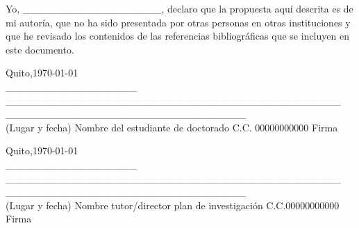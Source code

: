 Yo, \_\_\_\_\_\_\_\_\_\_\_\_\_\_\_\_\_\_\_, declaro que la propuesta aquí descrita es de mi autoría, que no ha sido presentada por otras personas en otras instituciones y que he revisado los contenidos de las referencias bibliográficas que se incluyen en este documento.

\vspace{1cm}

\begin{flushleft}
	Quito,\today\\
	\_\_\_\_\_\_\_\_\_\_\_\_\_\_\_\_\_\_\hspace{0.1cm} \_\_\_\_\_\_\_\_\_\_\_\_\_\_\_\_\_\_\_\_\_\_\_\_\_\_\_\_\_\_\_\_\_\_\_\_\_\_\_\_\_\_\_\_\_\_  \hspace{0.3cm}\_\_\_\_\_\_\_\_\_\_\_\_\_\_\_\_\_\hspace{0.1cm}\_\_\_\_\_\_\_\_\_\_\_\_\_\_\_\_\\
	(Lugar y fecha) \hspace{0.2cm} Nombre del estudiante de doctorado \hspace{0.2cm} C.C.\hspace{0.05cm} 00000000000 \hspace{0.1cm} Firma \\
\end{flushleft}

\vspace{1cm}

\begin{flushleft}
	Quito,\today\\
	\_\_\_\_\_\_\_\_\_\_\_\_\_\_\_\_\_\_\hspace{0.1cm} \_\_\_\_\_\_\_\_\_\_\_\_\_\_\_\_\_\_\_\_\_\_\_\_\_\_\_\_\_\_\_\_\_\_\_\_\_\_\_\_\_\_\_\_\_\_  \hspace{0.3cm}\_\_\_\_\_\_\_\_\_\_\_\_\_\_\_\_\_\hspace{0.1cm}\_\_\_\_\_\_\_\_\_\_\_\_\_\_\_\_\\
	(Lugar y fecha) \hspace{0.0cm} Nombre tutor/director plan de investigación \hspace{0.1cm} C.C.\hspace{0.05cm}00000000000 \hspace{0.1cm} Firma \\
\end{flushleft}


